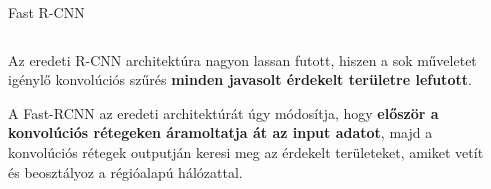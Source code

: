 \documentclass[english, aspectratio=169]{beamer}
\begin{document}
\begin{frame}{Fast R-CNN}
\begin{columns}
\begin{column}{.4\textwidth}
Az eredeti R-CNN architektúra nagyon lassan futott, hiszen a sok műveletet igénylő konvolúciós szűrés \textbf{minden javasolt érdekelt területre lefutott}.\par\smallskip
A Fast-RCNN az eredeti architektúrát úgy módosítja, hogy \textbf{először a konvolúciós rétegeken áramoltatja át az input adatot}, majd a konvolúciós rétegek outputján keresi meg az érdekelt területeket, amiket vetít és beosztályoz a régióalapú hálózattal.
\end{column}
\begin{column}{.6\textwidth}
\end{column}
\end{columns}
\end{frame}
\end{document}
